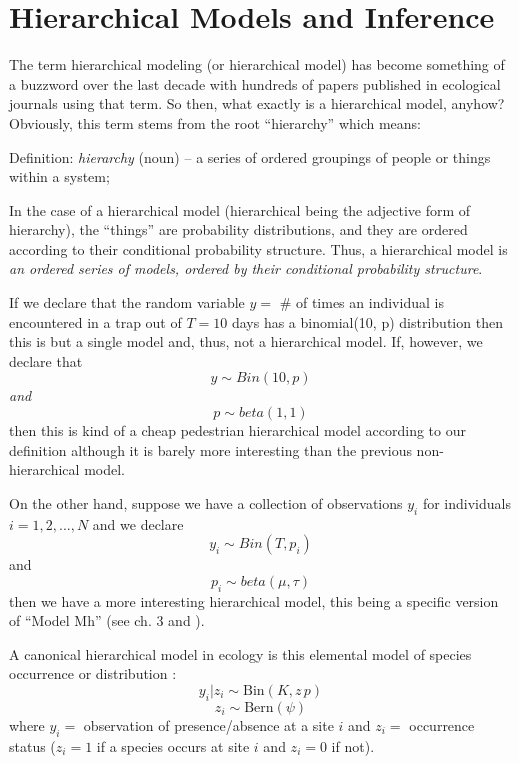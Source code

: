 \section{Hierarchical Models and Inference}

The term hierarchical modeling (or hierarchical model) has become
something of a buzzword over the last decade with hundreds of papers
published in ecological journals using that term.
So then, what exactly is a hierarchical
model, anyhow? Obviously, this term stems from the root ``hierarchy''
which means:

\vspace{.1in}

{\flushleft
Definition: {\it hierarchy} (noun) -- a series of ordered groupings of people or things within a system; 
}

\vspace{.1in}

In the case of a hierarchical model (hierarchical being the adjective
form of hierarchy), the ``things'' are probability distributions, and
they are ordered according to their conditional probability structure.
Thus, a hierarchical model is {\it an ordered series of models,
  ordered by their conditional probability structure}.  

If we declare
that the random variable $y = $ \# of times an individual is
encountered in a trap out of $T=10$ days has a binomial(10, p)
distribution then this is but a single model and, thus, not a
hierarchical model. If, however, we declare that 
\[
y \sim Bin(10,p)
\]
{\it and} 
\[ 
p \sim beta(1,1)
\] 
then this is kind of a cheap pedestrian
hierarchical model according to our definition although it is barely
more interesting than the previous non-hierarchical model.  

On the
other hand, suppose we have a collection of observations $y_{i}$ for
individuals $i=1,2,...,N$ and we declare 
\[
y_{i} \sim Bin(T, p_{i})
\]
 and
\[
p_{i}\sim beta(\mu, \tau)
\] 
then we have a more interesting
hierarchical model, this being a specific version of ``Model Mh'' (see
ch. 3 and \citet{dorazio_royle:2003}).  

A canonical hierarchical model in ecology is this
elemental model of species occurrence or distribution
\citep{mackenzie_etal:2002, tyre_etal:2003, kery:2011}:
\[
y_{i}|z_{i} \sim \mbox{Bin}(K,z \,  p)
\]
\[
z_{i} \sim \mbox{Bern}(\psi)
\]
where  $y_{i} = $ observation of presence/absence at a site $i$ and
$z_{i} = $ occurrence status ($z_{i}=1$ if a species occurs at  site
$i$ and $z_{i}=0$ if not). 

